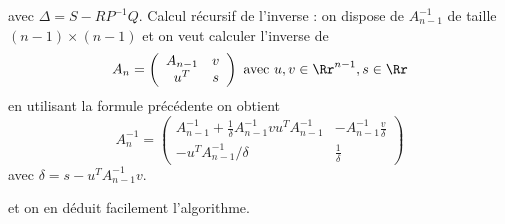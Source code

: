 {\begin{enumerate}
{avec $\Delta = S-RP^{-1}Q$.
Calcul r\'ecursif de l'inverse : on dispose de $A_{n-1}^{-1}$ de taille $(n-1)\times (n-1)$ et on veut calculer l'inverse de
$$A_n=\left(\begin{array}{cc} A_{n-1}& v\\
u^T & s\end{array}\right)\mbox{ avec } u,v\in\Rr^{n-1}, s\in\Rr $$
en utilisant la formule pr\'ec\'edente on obtient
$$A_n^{-1}=\left(\begin{array}{cc}
A_{n-1}^{-1} +\frac{1}{\delta} A_{n-1}^{-1} v u^T A_{n-1}^{-1} & - A_{n-1}^{-1}\frac{v}{\delta}\\
-u^TA_{n-1}^{-1}/\delta & \frac{1}{\delta}\end{array}\right)$$
avec $\delta=s-u^TA_{n-1}^{-1}v$.

et on en d\'eduit facilement l'algorithme.
}
\end{enumerate}
}
